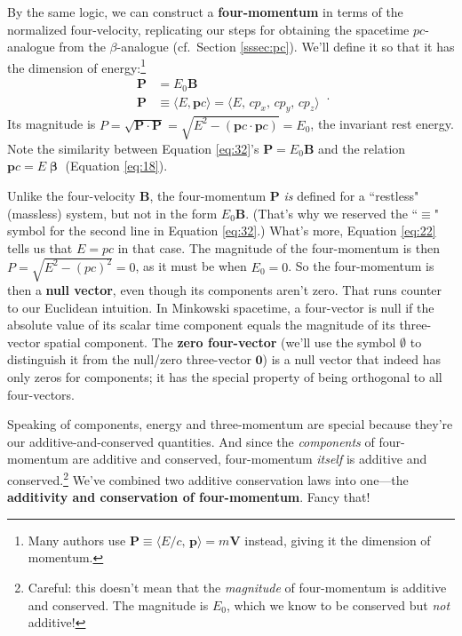 \documentclass[12pt]{article}
\renewcommand{\vv}[1]{\mathbf{#1}}
\newcommand{\vvbeta}{\bm{\upbeta}}
\begin{document}
By the same logic, we can construct a \textbf{four-momentum} in terms of the normalized four-velocity, replicating our steps for obtaining the spacetime $p c$-analogue from the $\beta$-analogue (cf.\ Section \ref{sssec:pc}). We'll define it so that it has the dimension of energy:\footnote{Many authors use $\vv P \equiv \langle E/c , \, \vv p \rangle = m \vv V$ instead, giving it the dimension of momentum.}
\begin{equation}\label{eq:32}
\boxed{
\begin{aligned}
\vv P &= E_0 \vv B \\
\vv P &\equiv \langle E, \vv p c \rangle = \langle E, \, c p_x, \, c p_y, \, c p_z \rangle
\end{aligned}
} \, .
\end{equation}
Its magnitude is $P = \sqrt{\vv P \cdot \vv P} = \sqrt{E^2 - (\vv p c \cdot \vv p c)} = E_0$, the invariant rest energy. Note the similarity between Equation \ref{eq:32}'s $\vv P = E_0 \vv B$ and the relation $\vv p c = E \vvbeta$ (Equation \ref{eq:18}).

Unlike the four-velocity $\vv B$, the four-momentum $\vv P$ \emph{is} defined for a ``restless" (massless) system, but not in the form $E_0 \vv B$. (That's why we reserved the ``$\equiv$" symbol for the second line in Equation \ref{eq:32}.) What's more, Equation \ref{eq:22} tells us that $E=p c$ in that case. The magnitude of the four-momentum is then $P = \sqrt{E^2 - (p c)^2} = 0$, as it must be when $E_0 = 0$. So the four-momentum is then a \textbf{null vector}, even though its components aren't zero. That runs counter to our Euclidean intuition. In Minkowski spacetime, a four-vector is null if the absolute value of its scalar time component equals the magnitude of its three-vector spatial component. The \textbf{zero four-vector} (we'll use the symbol \mbox{\boldmath$\emptyset$} to distinguish it from the null/zero three-vector $\vv 0$) is a null vector that indeed has only zeros for components; it has the special property of being orthogonal to all four-vectors.

Speaking of components, energy and three-momentum are special because they're our additive-and-conserved quantities. And since the \emph{components} of four-momentum are additive and conserved, four-momentum \emph{itself} is additive and conserved.\footnote{Careful: this doesn't mean that the \emph{magnitude} of four-momentum is additive and conserved. The magnitude is $E_0$, which we know to be conserved but \emph{not} additive!} We've combined two additive conservation laws into one---the \textbf{additivity and conservation of four-momentum}. Fancy that!
\end{document}
